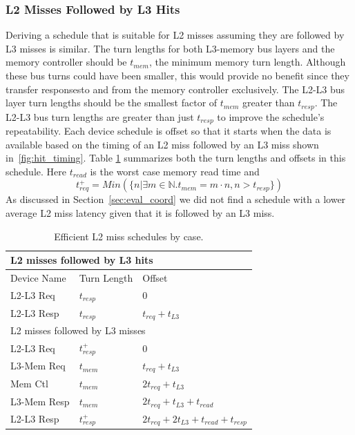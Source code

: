 \subsubsection{L2 Misses Followed by L3 Hits}
Deriving a schedule that is suitable for L2 misses assuming they are followed 
by L3 misses is similar. The turn lengths for both L3-memory bus layers and
the memory controller should be $t_{mem}$, the minimum memory turn length.
Although these bus turns could have been smaller, this would provide no
benefit since they transfer responsesto and from the memory controller exclusively.
The L2-L3 bus layer turn lengths should be
the smallest factor of $t_{mem}$ greater than $t_{resp}$. The L2-L3 bus turn 
lengths are greater than just $t_{resp}$ to improve the schedule's repeatability.
Each device schedule is offset so that it starts when the data is available 
based on the timing of an L2 miss followed by an L3 miss shown 
in~\ref{fig:hit_timing}. Table \ref{tab:l2_miss_schedules} summarizes both the
turn lengths and offsets in this schedule. Here $t_{read}$ is the worst case
memory read time and
\[
  t_{req}^+ = Min(\{n | \exists m\in \mathbb{N}.t_{mem}=m\cdot n, n > t_{resp}\})
\]
As discussed in Section~\ref{sec:eval_coord} we did not find a schedule with 
a lower average L2 miss latency given that it is followed by an L3 miss.

\def\dc{Blue}
\begin{table}
    \caption{Efficient L2 miss schedules by case.}
    \centering
    \begin{tabular}{|r|r|l|l|}
        \hline
        \multicolumn{4}{|l|}{L2 misses followed by L3 hits}\\\hline
        \multicolumn{2}{|l|}{Device Name} & Turn Length & Offset\\\hline
        \multicolumn{2}{|l|}{L2-L3 Req}  & $t_{resp}$ & 0\\\hline
        \multicolumn{2}{|l|}{L2-L3 Resp} & $t_{resp}$ &
          $t_{req}+t_{L3}$\\\hline\hline
        \multicolumn{4}{|l|}{L2 misses followed by L3 misses}\\\hline
        \multicolumn{2}{|l|}{L2-L3 Req}   & $t_{resp}^+$ & 0\\\hline
        \multicolumn{2}{|l|}{L3-Mem Req}  & $t_{mem}$ & $t_{req}+t_{L3}$\\\hline
        \multicolumn{2}{|l|}{Mem Ctl}     & $t_{mem}$ & $2t_{req}+t_{L3}$\\\hline
        \multicolumn{2}{|l|}{L3-Mem Resp} & $t_{mem}$ & 
          $2t_{req}+t_{L3}+t_{read}$\\\hline
        \multicolumn{2}{|l|}{L2-L3 Resp}  & $t_{resp}^+$ &
          $2t_{req}+2t_{L3}+t_{read}+t_{resp}$\\\hline
    \end{tabular}
    \label{tab:l2_miss_schedules}
\end{table}

